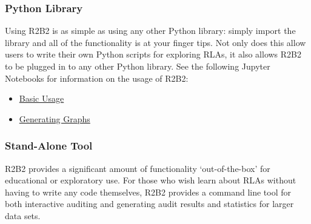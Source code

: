 \subsubsection{Python Library}

Using R2B2 is as simple as using any other Python library: simply import the library
and all of the functionality is at your finger tips. Not only does this allow users
to write their own Python scripts for exploring RLAs, it also allows R2B2 to be plugged
in to any other Python library. See the following Jupyter Notebooks for information on
the usage of R2B2:

\begin{itemize}
    \item \href{https://github.com/gwexploratoryaudits/r2b2/blob/notebooks/notebook/R2B2%20Basics.ipynb}{Basic Usage}
    \item \href{https://github.com/gwexploratoryaudits/r2b2/blob/notebooks/notebook/Generating%20Graphs.ipynb}{Generating Graphs}
\end{itemize}


\subsubsection{Stand-Alone Tool}

R2B2 provides a significant amount of functionality `out-of-the-box' for educational
or exploratory use. For those who wish learn about RLAs without having to write any
code themselves, R2B2 provides a command line tool for both interactive auditing and
generating audit results and statistics for larger data sets.

